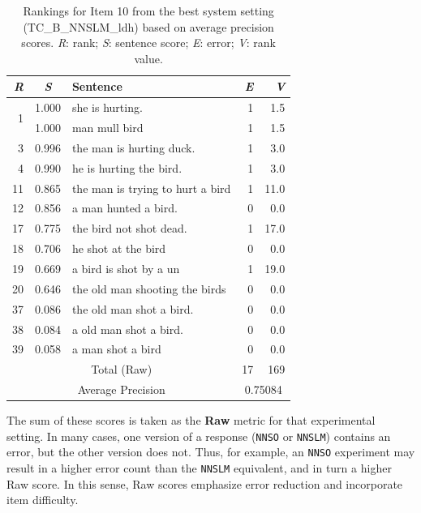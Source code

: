 \documentclass[11pt,letterpaper]{article}
\newcommand{\param}[1]{\texttt{#1}}
\begin{document}
\begin{table}[htb!]
\begin{center}
\setlength{\tabcolsep}{0.3em}
\begin{tabular}{|r|c|l|r|r|}
 \hline
 \textit{R} & \textit{S} & Sentence & \textit{E} & \textit{V}\\
 \hline
 \hline
\multirow{2}{*}{1} & 1.000 & she is hurting. & 1 & 1.5 \\
& 1.000 & man mull bird & 1 & 1.5 \\
\hline
3 & 0.996 & the man is hurting duck. & 1 & 3.0 \\
4 & 0.990 & he is hurting the bird. & 1 & 3.0 \\
\hline
11 & 0.865 & the man is trying to hurt a bird & 1 & 11.0 \\
12 & 0.856 & a man hunted a bird. & 0 & 0.0 \\
\hline
17 & 0.775 & the bird not shot dead.  & 1 & 17.0 \\
18 & 0.706 & he shot at the bird & 0 & 0.0 \\
19 & 0.669 & a bird is shot by a un & 1 & 19.0 \\
20 & 0.646 & the old man shooting the birds & 0 & 0.0 \\
\hline
37 & 0.086 & the old man shot a bird. & 0 & 0.0 \\
38 & 0.084 & a old man shot a bird. & 0 & 0.0 \\
39 & 0.058 & a man shot a bird & 0 & 0.0 \\
  \hline
  \hline
  \multicolumn{3}{|c|}{Total (Raw)} & 17 & 169 \\
  \hline
  \multicolumn{3}{|c|}{Average Precision} & \multicolumn{2}{c|}{0.75084} \\
 \hline
\end{tabular}
\caption{Rankings for Item 10 from the best system setting (TC\_B\_NNSLM\_ldh) based on average precision scores. \textit{R}: rank; \textit{S}: sentence score; \textit{E}: error; \textit{V}: rank value. }
\label{tab:i10responses-avgprec}
\end{center}
\end{table}

The sum of these scores is taken as the \textbf{Raw} metric for that
experimental setting. In many cases, one version of a response
(\param{NNSO} or \param{NNSLM}) contains an error, but the other
version does not. Thus, for example, an \param{NNSO} experiment may
result in a higher error count than the \param{NNSLM} equivalent, and
in turn a higher Raw score.
In this sense, Raw scores emphasize error reduction and incorporate
item difficulty.
\end{document}
